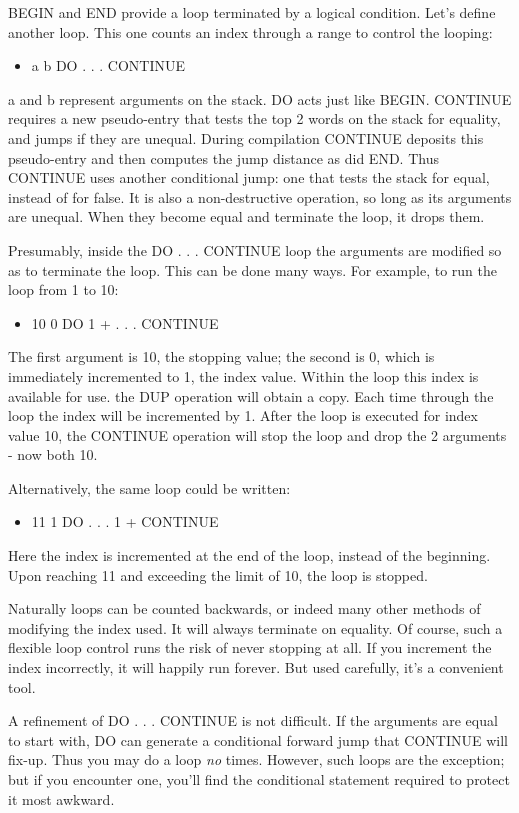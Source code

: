 \documentclass[b5paper, oneside]{book}
\begin{document}
BEGIN and END provide a loop terminated by a logical condition. Let's define another loop. This one counts an index through a range to control the looping:\begin{itemize}
   \item a b DO . . . CONTINUE\end{itemize}
a and b represent arguments on the stack. DO acts just like BEGIN. CONTINUE requires a new pseudo-entry that tests the top 2 words on the stack for equality, and jumps if they are unequal. During compilation CONTINUE deposits this pseudo-entry and then computes the jump distance as did END. Thus CONTINUE uses another conditional jump: one that tests the stack for equal, instead of for false. It is also a non-destructive operation, so long as its arguments are unequal. When they become equal and terminate the loop, it drops them.

Presumably, inside the DO . . . CONTINUE loop the arguments are modified so as to terminate the loop. This can be done many ways. For example, to run the loop from 1 to 10:\begin{itemize}
   \item 10 0 DO 1 + . . . CONTINUE\end{itemize}
The first argument is 10, the stopping value; the second is 0, which is immediately incremented to 1, the index value. Within the loop this index is available for use. the DUP operation will obtain a copy. Each time through the loop the index will be incremented by 1. After the loop is executed for index value 10, the CONTINUE operation will stop the loop and drop the 2 arguments - now both 10.

Alternatively, the same loop could be written:\begin{itemize}
   \item 11 1 DO . . . 1 + CONTINUE\end{itemize}
Here the index is incremented at the end of the loop, instead of the beginning. Upon reaching 11 and exceeding the limit of 10, the loop is stopped.

Naturally loops can be counted backwards, or indeed many other methods of modifying the index used. It will always terminate on equality. Of course, such a flexible loop control runs the risk of never stopping at all. If you increment the index incorrectly, it will happily run forever. But used carefully, it's a convenient tool.

A refinement of DO . . . CONTINUE is not difficult. If the arguments are equal to start with, DO can generate a conditional forward jump that CONTINUE will fix-up. Thus you may do a loop {\em no} times. However, such loops are the exception; but if you encounter one, you'll find the conditional statement required to protect it most awkward.
\end{document}
